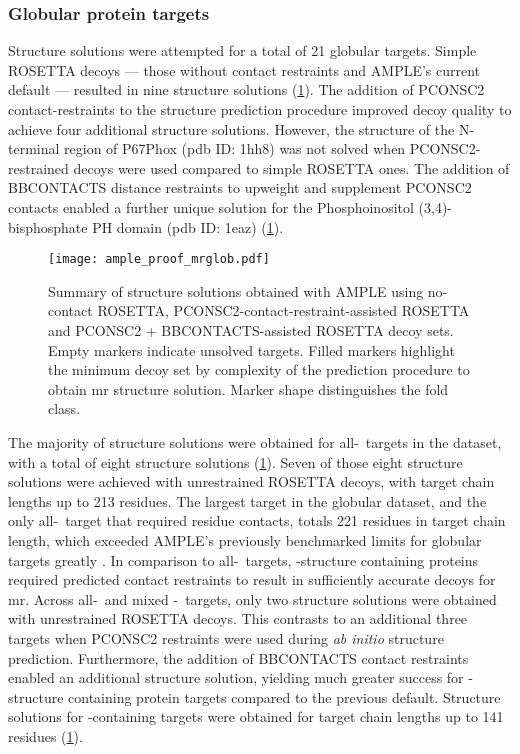 \subsubsection{Globular protein targets} \label{subsec:ample_proof_globmr}
Structure solutions were attempted for a total of 21 globular targets. Simple ROSETTA decoys --- those without contact restraints and AMPLE's current default --- resulted in nine structure solutions (\cref{fig:ample_proof_mrglob}). The addition of PCONSC2 contact-restraints to the structure prediction procedure improved decoy quality to achieve four additional structure solutions. However, the structure of the N-terminal region of P67Phox (\gls{pdb} ID: 1hh8) was not solved when PCONSC2-restrained decoys were used compared to simple ROSETTA ones. The addition of BBCONTACTS distance restraints to upweight and supplement PCONSC2 contacts enabled a further unique solution for the Phosphoinositol (3,4)-bisphosphate PH domain (\gls{pdb} ID: 1eaz) (\cref{fig:ample_proof_mrglob}).

\begin{figure}[H]
    \centering
    \texttt{[image: ample\_proof\_mrglob.pdf]}
    \caption[Structure solution summary for globular targets]{Summary of structure solutions obtained with AMPLE using no-contact ROSETTA, PCONSC2-contact-restraint-assisted ROSETTA and PCONSC2 + BBCONTACTS-assisted ROSETTA decoy sets. Empty markers indicate unsolved targets. Filled markers highlight the minimum decoy set by complexity of the prediction procedure to obtain \gls{mr} structure solution. Marker shape distinguishes the fold class.}
    \label{fig:ample_proof_mrglob}
\end{figure}

The majority of structure solutions were obtained for all-\textalpha\ targets in the dataset, with a total of eight structure solutions (\cref{fig:ample_proof_mrglob}). Seven of those eight structure solutions were achieved with unrestrained ROSETTA decoys, with target chain lengths up to 213 residues. The largest target in the globular dataset, and the only all-\textalpha\ target that required residue contacts, totals 221 residues in target chain length, which exceeded AMPLE's previously benchmarked limits for globular targets greatly \cite{Bibby2012-lm}. In comparison to all-\textalpha\ targets, \textbeta-structure containing proteins required predicted contact restraints to result in sufficiently accurate decoys for \gls{mr}. Across all-\textbeta\ and mixed \textalpha-\textbeta\ targets, only two structure solutions were obtained with unrestrained ROSETTA decoys. This contrasts to an additional three targets when PCONSC2 restraints were used during \textit{ab initio} structure prediction. Furthermore, the addition of BBCONTACTS contact restraints enabled an additional structure solution, yielding much greater success for \textbeta-structure containing protein targets compared to the previous default. Structure solutions for \textbeta-containing targets were obtained for target chain lengths up to 141 residues (\cref{fig:ample_proof_mrglob}).

